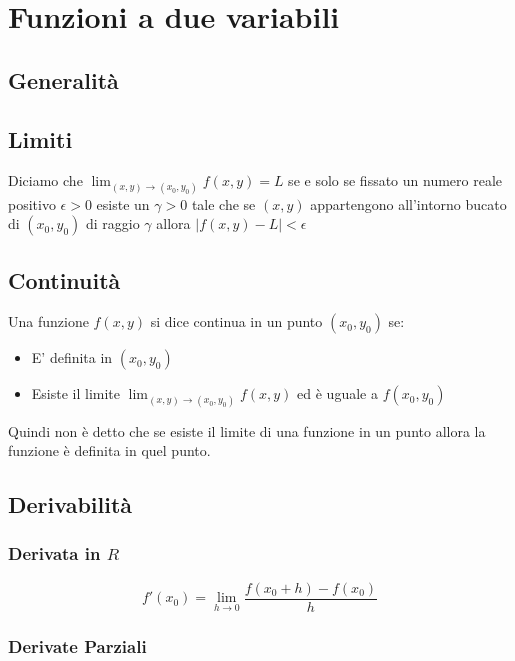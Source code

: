 \usepackage{graphicx}
\graphicspath{ {img/} }

\chapter{Funzioni a due variabili}

\section{Generalità}

\section{Limiti}

Diciamo che $\lim_{(x,y)\to(x_0,y_0)} f(x,y) = L$ se e solo se fissato un numero reale positivo $\epsilon>0$ esiste un $\gamma>0$ tale che se $(x,y)$ appartengono all'intorno bucato di $(x_0,y_0)$ di raggio $\gamma$ allora $|f(x,y)-L|<\epsilon$

\section{Continuità}

Una funzione $f(x,y)$ si dice continua in un punto $(x_0,y_0)$ se:

\begin{itemize}
\item E' definita in $(x_0,y_0)$
\item Esiste il limite $\lim_{(x,y)\to(x_0,y_0)} f(x,y)$ ed è uguale a $f(x_0,y_0)$
\end{itemize}

Quindi non è detto che se esiste il limite di una funzione in un punto allora la funzione è definita in quel punto.

\section{Derivabilità}

\subsection{Derivata in $R$}

$$f'(x_0)=\lim_{h\to 0}\frac{f(x_0+h)-f(x_0)}{h}$$

\subsection{Derivate Parziali}

